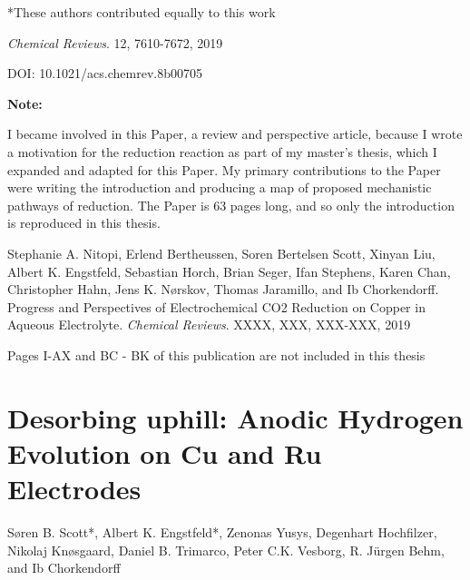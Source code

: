 \begin{flushleft}
		*These authors contributed equally to this work
		
		\textit{Chemical Reviews}. 12, 7610-7672, 2019
		
		DOI: 10.1021/acs.chemrev.8b00705
		
		\vspace{2cm}
		
		\textbf{Note:}
		
		I became involved in this Paper, a review and perspective article, because I wrote a motivation for the  reduction reaction as part of my master's thesis, which I expanded and adapted for this Paper. My primary contributions to the Paper were writing the introduction and producing a map of proposed mechanistic pathways of  reduction. The Paper is 63 pages long, and so only the introduction is reproduced in this thesis.	
		
		
		
		\clearpage
		\vspace{5cm}
		
		
		{
			\hspace{0pt}
			\vfill
			Stephanie A. Nitopi, Erlend Bertheussen, Soren Bertelsen Scott, Xinyan Liu, Albert K. Engstfeld, Sebastian Horch, Brian Seger, Ifan Stephens, Karen Chan, Christopher Hahn, Jens K. Nørskov, Thomas Jaramillo, and Ib Chorkendorff. Progress and Perspectives of Electrochemical CO2 Reduction on Copper in Aqueous Electrolyte. \textit{Chemical Reviews}. XXXX, XXX, XXX-XXX, 2019
			
			\vspace{1cm}
			
			\centering\Large
			Pages I-AX and BC - BK of this publication are not included in this thesis
			\vfill
			\hspace{0pt}
		}
		\clearpage
		
		
		


	
		\clearpage
		\section[In Preparation - Desorbing uphill: Anodic Hydrogen Evolution on Cu and Ru Electrodes]{Desorbing uphill: Anodic Hydrogen Evolution on Cu and Ru Electrodes}\label{Scott_Engstfeld2019}
		
		Søren B. Scott*, Albert K. Engstfeld*, Zenonas Yusys, Degenhart Hochfilzer, Nikolaj Knøsgaard, Daniel B. Trimarco, Peter C.K. Vesborg, R. Jürgen Behm, and Ib Chorkendorff
		

\end{flushleft}
